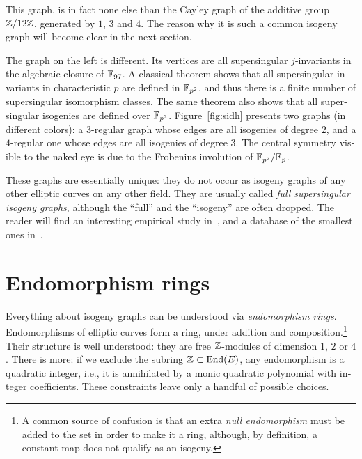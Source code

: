 \begin{otherlanguage}{english}
  This graph, is in fact none else than the Cayley graph of the
  additive group $\mathbb{Z}/12\mathbb{Z}$, generated by $1$, $3$ and $4$. The reason
  why it is such a common isogeny graph will become clear in the next
  section.

  The graph on the left is different. Its vertices are all
  supersingular $j$-invariants in the algebraic closure of
  $\mathbb{F}_{97}$. A classical theorem shows that all supersingular
  invariants in characteristic $p$ are defined in $\mathbb{F}_{p^2}$, and thus
  there is a finite number of supersingular isomorphism classes. The
  same theorem also shows that all supersingular isogenies are defined
  over $\mathbb{F}_{p^2}$. Figure~\ref{fig:sidh} presents two graphs (in different
  colors): a $3$-regular graph whose edges are all isogenies of degree
  $2$, and a $4$-regular one whose edges are all isogenies of degree
  $3$. The central symmetry visible to the naked eye is due to the
  Frobenius involution of $\mathbb{F}_{p^2}/\mathbb{F}_p$.

  These graphs are essentially unique: they do not occur as isogeny
  graphs of any other elliptic curves on any other field. They are
  usually called \emph{full supersingular isogeny graphs}, although
  the ``full'' and the ``isogeny'' are often dropped. The reader will find an
  interesting empirical study in~\cite{cryptoeprint:2019:1056}, and a
  database of the smallest ones in~\cite{ssingular-db}.

  
  \section{Endomorphism rings}

  Everything about isogeny graphs can be understood via
  \emph{endomorphism rings}. Endomorphisms of elliptic curves form a
  ring, under addition and composition.\footnote{A common source of
    confusion is that an extra \emph{null endomorphism} must be added
    to the set in order to make it a ring, although, by definition, a
    constant map does not qualify as an isogeny.} Their structure is
  well understood: they are free $\mathbb{Z}$-modules of dimension $1$, $2$ or
  $4$. There is more: if we exclude the subring $\mathbb{Z}\subset\mathrm{End}(E)$,
  any endomorphism is a quadratic integer, i.e., it is annihilated by
  a monic quadratic polynomial with integer coefficients. These
  constraints leave only a handful of possible choices.


\end{otherlanguage}
